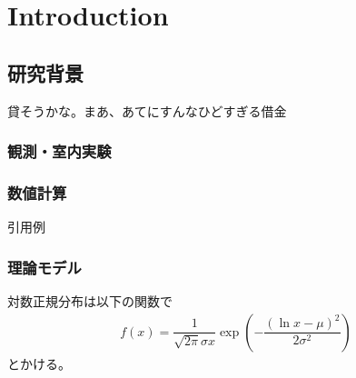 \chapter{Introduction}\label{chap:intro}
\section{研究背景}
貸そうかな。まあ、あてにすんなひどすぎる借金 
\subsection{観測・室内実験}

\subsection{数値計算}
引用例\cite{yoshii2019delamination, yajima2020aversion}
\subsection{理論モデル}

対数正規分布は以下の関数で
\begin{align*}
   f(x) = \dfrac{1}{\sqrt{2\pi}\sigma x} \exp\left( -\dfrac{(\ln x -\mu)^2}{2\sigma^2} \right)
\end{align*}
とかける。
